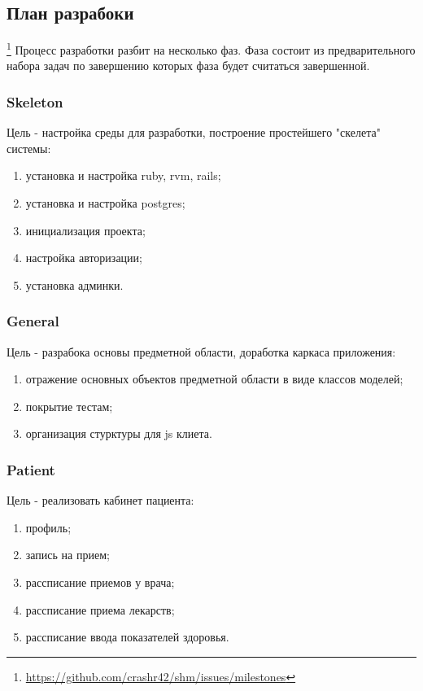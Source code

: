 \subsection{План разрабоки}\footnote{
	\url{https://github.com/crashr42/shm/issues/milestones}
}
Процесс разработки разбит на несколько фаз. Фаза состоит из предварительного
набора задач по завершению которых  фаза будет считаться завершенной.

\subsubsection{Skeleton}
Цель - настройка среды для разработки, построение простейшего "скелета" системы:
\begin{enumerate}
  \item установка и настройка ruby, rvm, rails;
  \item установка и настройка postgres;
  \item инициализация проекта;
  \item настройка авторизации;
  \item установка админки.
\end{enumerate}

\subsubsection{General}
Цель - разрабока основы предметной области, доработка каркаса приложения:
\begin{enumerate}
  \item отражение основных объектов предметной области в виде классов моделей;
  \item покрытие тестам;
  \item организация стурктуры для js клиета.
\end{enumerate}

\subsubsection{Patient}
Цель - реализовать кабинет пациента:
\begin{enumerate}
  \item профиль;
  \item запись на прием;
  \item рассписание приемов у врача;
  \item рассписание приема лекарств;
  \item рассписание ввода показателей здоровья.   
\end{enumerate}

